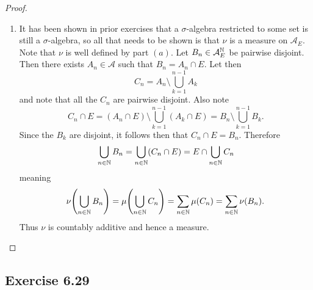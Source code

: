 \documentclass[hw_all.tex]{subfiles}
\begin{document}
\begin{proof}
\begin{enumerate}
        \item
            It has been shown in prior exercises that a $\sigma$-algebra restricted to some set is still a $\sigma$-algebra, so all that needs to be shown is that $\nu$ is a measure on $\mathcal{A}_E$. Note that $\nu$ is well defined by part $(a)$. Let $B_n \in \mathcal{A}_E^{\mathbb{N}}$ be pairwise disjoint. Then there exists $A_n \in \mathcal{A}$ such that $B_n = A_n \cap E$. Let then
            \[
                C_n = A_n \setminus \bigcup_{k=1}^{n - 1} A_k
            \]
            and note that all the $C_n$ are pairwise disjoint. Also note
            \[
                C_n \cap E = (A_n \cap E) \setminus \bigcup_{k=1}^{n-1} (A_k \cap E) = B_n \setminus \bigcup_{k=1}^{n-1} B_k
            .\]
            Since the $B_k$ are disjoint, it follows then that $C_n \cap E = B_n$. Therefore
            \[
                \bigcup_{n \in \mathbb{N}} B_n = \bigcup_{n\in \mathbb{N}} (C_n \cap E) = E \cap \bigcup_{n \in \mathbb{N}} C_n
            \]
            meaning
            \[
                \nu\qty(\bigcup_{n \in \mathbb{N}} B_n) = \mu\qty(\bigcup_{n\in \mathbb{N}} C_n) = \sum_{n \in \mathbb{N}} \mu(C_n) = \sum_{n \in \mathbb{N}} \nu(B_n)
            .\]
            Thus $\nu$ is countably additive and hence a measure.
    \end{enumerate}
\end{proof}

\subsection{Exercise 6.29}
\end{document}
